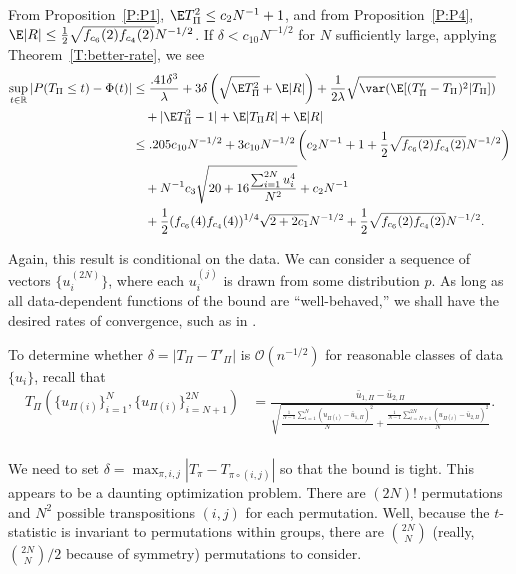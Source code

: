 From Proposition~\ref{P:P1}, $\E T_{\Pi}^2 \leq c_2 N^{-1} + 1$, and
from Proposition~\ref{P:P4}, $\E|R| \leq
\frac{1}{2}\sqrt{f_{c_6}(2)f_{c_4}(2)} N^{-1/2}$.
If $\delta < c_{10}N^{-1/2}$ for $N$ sufficiently large, applying
Theorem~\ref{T:better-rate}, we see
\begin{equation*}
  \begin{split}
    \sup_{t \in \mathbb{R}} |P(T_{\Pi} \leq t) - \Phi(t)|
    &\leq \frac{.41 \delta^3}{\lambda} + 3 \delta \left ( \sqrt{\E T_{\Pi}^2} + \E |R| \right )
    + \frac{1}{2\lambda} \sqrt{\var (\E [(T_{\Pi}'-T_{\Pi})^2|T_{\Pi}])} \\
    &\quad + |\E T_{\Pi}^2 - 1| + \E |T_{\Pi} R| + \E |R| \\
    &\leq .205 c_{10} N^{-1/2} + 3c_{10} N^{-1/2} \left (
      c_2 N^{-1} + 1 + \frac{1}{2}\sqrt{f_{c_6}(2)f_{c_4}(2)} N^{-1/2}
      \right ) \\
    &\quad + N^{-1} c_3\sqrt{20 + 16\frac{\sum_{i=1}^{2N} u_{i}^4}{N^2}} + c_2 N^{-1} \\
    &\quad + \frac{1}{2}(f_{c_6}(4)f_{c_4}(4))^{1/4} \sqrt{2+2c_1} N^{-1/2} +
    \frac{1}{2}\sqrt{f_{c_6}(2)f_{c_4}(2)} N^{-1/2}.
  \end{split}
\end{equation*}

Again, this result is conditional on the data.  We can consider a sequence
of vectors $\{u_i^{(2N)}\}$, where each $u_i^{(j)}$ is drawn from some distribution $p$.
As long as all data-dependent functions of the bound are ``well-behaved,'' we shall
have the desired rates of convergence, such as in \cite{bolthausen1984estimate}.

To determine whether $\delta = |T_{\Pi}-T'_{\Pi}|$ is
$\mathcal{O}(n^{-1/2})$ for reasonable classes of data $\{u_i\}$, recall that
\begin{align*}
T_{\Pi}(\{u_{\Pi(i)}\}_{i=1}^N, \{u_{\Pi(i)}\}_{i=N+1}^{2N})
&= \frac{\bar{u}_{1,\Pi} - \bar{u}_{2,\Pi}}{\sqrt{\frac{\frac{1}{N-1}
      \sum_{i=1}^N(u_{\Pi(i)} - \bar{u}_{1,\Pi})^2}{N} + \frac{\frac{1}{N-1}
      \sum_{i=N+1}^{2N}(u_{\Pi(i)} - \bar{u}_{2,\Pi})^2}{N}}}. \\
\end{align*}

We need to set $\delta = \max_{\pi, i, j} |T_{\pi} - T_{\pi \circ (i, j)}|$
so that the bound is tight.  This appears to be a daunting
optimization problem.  There are $(2N)!$ permutations and $N^2$
possible transpositions $(i, j)$ for each permutation.  Well, because the
$t$-statistic is invariant to permutations within groups, there are
$\binom{2N}{N}$ (really, $\binom{2N}{N} / 2$ because of symmetry)
permutations to consider.

